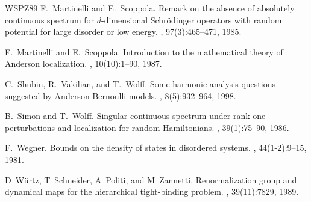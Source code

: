 \documentclass[11pt,reqno,UTF8,twoside]{amsart}
\theoremstyle{definition}
\numberwithin{equation}{section}
\begin{document}
\begin{thebibliography}{WSPZ89}
F.~Martinelli and E.~Scoppola.
\newblock Remark on the absence of absolutely continuous spectrum for
  {$d$}-dimensional {S}chr\"{o}dinger operators with random potential for large
  disorder or low energy.
, 97(3):465--471, 1985.

F.~Martinelli and E.~Scoppola.
\newblock Introduction to the mathematical theory of {A}nderson localization.
, 10(10):1--90, 1987.

C.~Shubin, R.~Vakilian, and T.~Wolff.
\newblock Some harmonic analysis questions suggested by {A}nderson-{B}ernoulli
  models.
, 8(5):932--964, 1998.

B.~Simon and T.~Wolff.
\newblock Singular continuous spectrum under rank one perturbations and
  localization for random {H}amiltonians.
, 39(1):75--90, 1986.

F.~Wegner.
\newblock Bounds on the density of states in disordered systems.
, 44(1-2):9--15, 1981.

D~W{\"u}rtz, T~Schneider, A~Politi, and M~Zannetti.
\newblock Renormalization group and dynamical maps for the hierarchical
  tight-binding problem.
, 39(11):7829, 1989.

\end{thebibliography}
\end{document}

